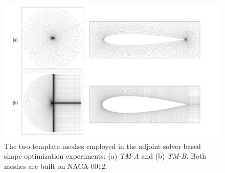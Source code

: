 \begin{figure}[!tb]
    \begin{center}
        \includegraphics[width=0.9\linewidth]{chapter4/fig/template_meshes.pdf}
    \end{center}
    \caption{
        \small The two template meshes employed in the adjoint solver based shape optimization experiments: (a) \textit{TM-A} and (b) \textit{TM-B}. Both meshes are built on NACA-0012.
    }
    \label{ch4:fig:template_meshes}
\end{figure}